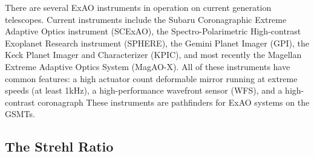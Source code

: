 There are several ExAO instruments in operation on current generation telescopes. Current instruments include the Subaru Coronagraphic Extreme Adaptive Optics instrument (SCExAO)\cite{jovanovic2015subaru}, the Spectro-Polarimetric High-contrast Exoplanet Research instrument (SPHERE)\cite{beuzit2008sphere}, the Gemini Planet Imager (GPI)\cite{macintosh2014first}, the Keck Planet Imager and Characterizer (KPIC)\cite{jovanovic2019keck}, and most recently the Magellan Extreme Adaptive Optics System (MagAO-X)\cite{males2020magao}. All of these instruments have common features: a high actuator count deformable mirror running at extreme speeds (at least 1kHz), a high-performance wavefront sensor (WFS), and a high-contrast coronagraph These instruments are pathfinders for ExAO systems on the GSMTs.















\subsection{The Strehl Ratio}

